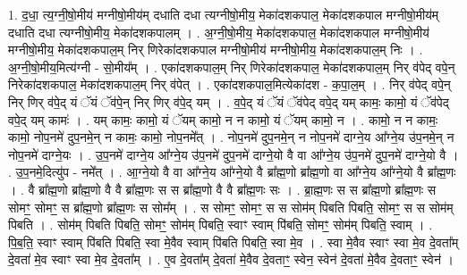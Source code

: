 \documentclass[17pt]{extarticle}
\begin{document}
1. द॒धा॒ त्य॒ग्नी॒षो॒मीय॑ मग्नीषो॒मीय॑म् दधाति दधा त्यग्नीषो॒मीय॒ मेका॑दशकपाल॒ मेका॑दशकपाल मग्नीषो॒मीय॑म् दधाति दधा त्यग्नीषो॒मीय॒ मेका॑दशकपालम् । . अ॒ग्नी॒षो॒मीय॒ मेका॑दशकपाल॒ मेका॑दशकपाल मग्नीषो॒मीय॑ मग्नीषो॒मीय॒ मेका॑दशकपाल॒म् निर् णिरेका॑दशकपाल मग्नीषो॒मीय॑ मग्नीषो॒मीय॒ मेका॑दशकपाल॒म् निः । . अ॒ग्नी॒षो॒मीय॒मित्य॑ग्नी - सो॒मीय᳚म् । . एका॑दशकपाल॒म् निर् णिरेका॑दशकपाल॒ मेका॑दशकपाल॒म् निर् व॑पेद् वपे॒न् निरेका॑दशकपाल॒ मेका॑दशकपाल॒म् निर् व॑पेत् । . एका॑दशकपाल॒मित्येका॑दश - क॒पा॒ल॒म् । . निर् व॑पेद् वपे॒न् निर् णिर् व॑पे॒द् यं ॅयं ॅव॑पे॒न् निर् णिर् व॑पे॒द् यम् । . व॒पे॒द् यं ॅयं ॅव॑पेद् वपे॒द् यम् कामः॒ कामो॒ यं ॅव॑पेद् वपे॒द् यम् कामः॑ । . यम् कामः॒ कामो॒ यं ॅयम् कामो॒ न न कामो॒ यं ॅयम् कामो॒ न । . कामो॒ न न कामः॒ कामो॒ नोप॒नमे॑ दुप॒नमे॒न् न कामः॒ कामो॒ नोप॒नमे᳚त् । . नोप॒नमे॑ दुप॒नमे॒न् न नोप॒नमे॑ दाग्ने॒य आ᳚ग्ने॒य उ॑प॒नमे॒न् न नोप॒नमे॑ दाग्ने॒यः । . उ॒प॒नमे॑ दाग्ने॒य आ᳚ग्ने॒य उ॑प॒नमे॑ दुप॒नमे॑ दाग्ने॒यो वै वा आ᳚ग्ने॒य उ॑प॒नमे॑ दुप॒नमे॑ दाग्ने॒यो वै । . उ॒प॒नमे॒दित्यु॑प - नमे᳚त् । . आ॒ग्ने॒यो वै वा आ᳚ग्ने॒य आ᳚ग्ने॒यो वै ब्रा᳚ह्म॒णो ब्रा᳚ह्म॒णो वा आ᳚ग्ने॒य आ᳚ग्ने॒यो वै ब्रा᳚ह्म॒णः । . वै ब्रा᳚ह्म॒णो ब्रा᳚ह्म॒णो वै वै ब्रा᳚ह्म॒णः स स ब्रा᳚ह्म॒णो वै वै ब्रा᳚ह्म॒णः सः । . ब्रा॒ह्म॒णः स स ब्रा᳚ह्म॒णो ब्रा᳚ह्म॒णः स सोमꣳ॒॒ सोमꣳ॒॒ स ब्रा᳚ह्म॒णो ब्रा᳚ह्म॒णः स सोम᳚म् । . स सोमꣳ॒॒ सोमꣳ॒॒ स स सोम॑म् पिबति पिबति॒ सोमꣳ॒॒ स स सोम॑म् पिबति । . सोम॑म् पिबति पिबति॒ सोमꣳ॒॒ सोम॑म् पिबति॒ स्वाꣳ स्वाम् पि॑बति॒ सोमꣳ॒॒ सोम॑म् पिबति॒ स्वाम् । . पि॒ब॒ति॒ स्वाꣳ स्वाम् पि॑बति पिबति॒ स्वा मे॒वैव स्वाम् पि॑बति पिबति॒ स्वा मे॒व । . स्वा मे॒वैव स्वाꣳ स्वा मे॒व दे॒वता᳚म् दे॒वता॑ मे॒व स्वाꣳ स्वा मे॒व दे॒वता᳚म् । . ए॒व दे॒वता᳚म् दे॒वता॑ मे॒वैव दे॒वताꣳ॒॒ स्वेन॒ स्वेन॑ दे॒वता॑ मे॒वैव दे॒वताꣳ॒॒ स्वेन॑ । \newline
\end{document}
